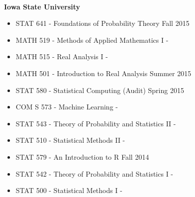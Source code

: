 \documentclass{res} %
\begin{document}
\begin{resume}
\hrulefill \\
{\bf Iowa State University }
\begin{itemize}\itemsep -2pt 
\item STAT 641 - Foundations of Probability Theory \dotfill Fall 2015
\item MATH 519 - Methods of Applied Mathematics I \hfill - 
\item MATH 515 - Real Analysis I \hfill -
\item MATH 501 - Introduction to Real Analysis \dotfill Summer 2015 
\item STAT 580 - Statistical Computing (Audit) \dotfill Spring 2015
\item COM S 573 - Machine Learning \hfill -
\item STAT 543 - Theory of Probability and Statistics II \hfill -
\item STAT 510 - Statistical Methods II \hfill -
\item STAT 579 - An Introduction to R \dotfill Fall 2014
\item STAT 542 - Theory of Probability and Statistics I \hfill -
\item STAT 500 - Statistical Methods I \hfill -
\end{itemize}



\end{resume} 
\end{document}
